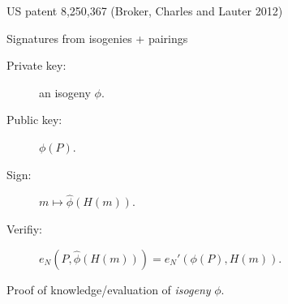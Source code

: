 \documentclass[aspectratio=169]{beamer}
\begin{document}

\begin{frame}{US patent 8,250,367 (Broker, Charles and Lauter 2012)}
  \begin{block}{Signatures from isogenies + pairings}
    \begin{description}
    \item[Private key:] an isogeny $\phi$.
    \item[Public key:] $\phi(P)$.
    \item[Sign:] $m ↦ \hat\phi(H(m))$.
    \item[Verifiy:] $e_N(P, \hat\phi(H(m))) = e_N'(\phi(P), H(m))$.
    \end{description}
  \end{block}

  \begin{center}
  \end{center}
  
  Proof of knowledge/evaluation of \emph{isogeny} $\phi$.  
\end{frame}

\end{document}
